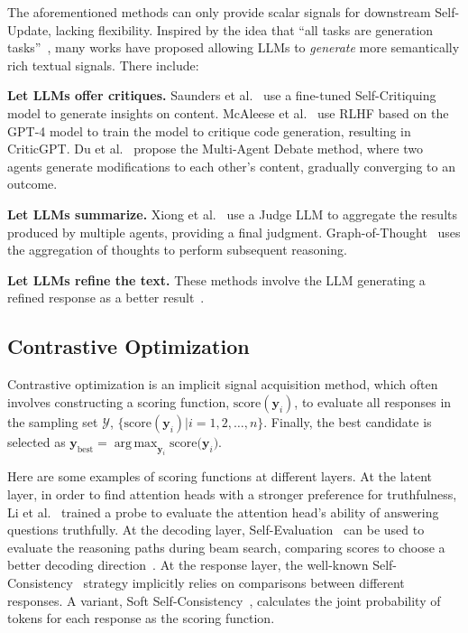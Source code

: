 \documentclass[lettersize,journal]{IEEEtran}
\DeclareMathOperator*{\argmax}{arg\,max} %
\begin{document}
\noindent The aforementioned methods can only provide scalar signals for downstream Self-Update, lacking flexibility. Inspired by the idea that ``all tasks are generation tasks''~\cite{BARTScore_21_NeuIPS_CMU,GPTScore_23_arXiv_NUS}, many works have proposed allowing LLMs to \textit{generate} more semantically rich textual signals. There include:

\textbf{Let LLMs offer critiques.} Saunders et al.~\cite{SelfCritiquing_22_arXiv_OpenAI} use a fine-tuned Self-Critiquing model to generate insights on content. McAleese et al.~\cite{CriticGPT_24_arXiv_OpenAI} use RLHF based on the GPT-4 model to train the model to critique code generation, resulting in CriticGPT. Du et al.~\cite{Debate_23_arXiv_MIT} propose the Multi-Agent Debate method, where two agents generate modifications to each other's content, gradually converging to an outcome.

\textbf{Let LLMs summarize.} Xiong et al.~\cite{ModalCollaboration_23_EMNLP_HIT} use a Judge LLM to aggregate the results produced by multiple agents, providing a final judgment. Graph-of-Thought~\cite{GoT_24_AAAI_ETH} uses the aggregation of thoughts to perform subsequent reasoning.

\textbf{Let LLMs refine the text.} These methods involve the LLM generating a refined response as a better result~\cite{SelfRefine_23_NeuIPS_CMU,Reflexion_23_NeuIPS_Northeastern,SelfCorrect_23_ICLR_AI2}.


\subsection{Contrastive Optimization}  \label{sec:contrastive_optimization}


\noindent Contrastive optimization is an implicit signal acquisition method, which often involves constructing a scoring function, $\text{score}(\boldsymbol{y}_i)$, to evaluate all responses in the sampling set $\mathcal{Y}$, $\{ \text{score}(\boldsymbol{y}_i) | i=1,2,\ldots,n\}$. Finally, the best candidate is selected as $\boldsymbol{y}_\text{best} = \argmax_{\boldsymbol{y}_i}{\text{score}(\boldsymbol{y}_i})$.

Here are some examples of scoring functions at different layers. At the latent layer, in order to find attention heads with a stronger preference for truthfulness, Li et al.~\cite{ITI_23_NeuIPS_Harvard} trained a probe to evaluate the attention head's ability of answering questions truthfully. At the decoding layer, Self-Evaluation~\cite{TheoryKnowKnow_22_arXiv_Anthropic} can be used to evaluate the reasoning paths during beam search, comparing scores to choose a better decoding direction~\cite{SelfEvaluation_23_NeuIPS_NUS}. At the response layer, the well-known Self-Consistency~\cite{SelfConsistency_23_ICLR_Google} strategy implicitly relies on comparisons between different responses. A variant, Soft Self-Consistency~\cite{SoftSelfConsistency_24_arXiv_UNCChapel}, calculates the joint probability of tokens for each response as the scoring function.
\end{document}
